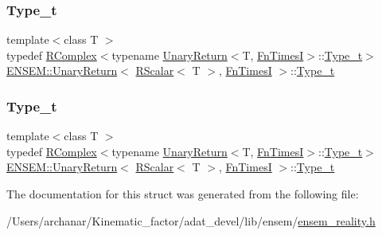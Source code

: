 \subsubsection{\texorpdfstring{Type\_t}{Type\_t}\hspace{0.1cm}{\footnotesize\ttfamily [1/2]}}
{\footnotesize\ttfamily template$<$class T $>$ \\
typedef \mbox{\hyperlink{classENSEM_1_1RComplex}{R\+Complex}}$<$typename \mbox{\hyperlink{structENSEM_1_1UnaryReturn}{Unary\+Return}}$<$T, \mbox{\hyperlink{structENSEM_1_1FnTimesI}{Fn\+TimesI}}$>$\+::\mbox{\hyperlink{structENSEM_1_1UnaryReturn_3_01RScalar_3_01T_01_4_00_01FnTimesI_01_4_ab4ba902ca0b5815b1d94723d80d0b878}{Type\+\_\+t}}$>$ \mbox{\hyperlink{structENSEM_1_1UnaryReturn}{E\+N\+S\+E\+M\+::\+Unary\+Return}}$<$ \mbox{\hyperlink{classENSEM_1_1RScalar}{R\+Scalar}}$<$ T $>$, \mbox{\hyperlink{structENSEM_1_1FnTimesI}{Fn\+TimesI}} $>$\+::\mbox{\hyperlink{structENSEM_1_1UnaryReturn_3_01RScalar_3_01T_01_4_00_01FnTimesI_01_4_ab4ba902ca0b5815b1d94723d80d0b878}{Type\+\_\+t}}}

\mbox{\label{structENSEM_1_1UnaryReturn_3_01RScalar_3_01T_01_4_00_01FnTimesI_01_4_ab4ba902ca0b5815b1d94723d80d0b878}} 
\subsubsection{\texorpdfstring{Type\_t}{Type\_t}\hspace{0.1cm}{\footnotesize\ttfamily [2/2]}}
{\footnotesize\ttfamily template$<$class T $>$ \\
typedef \mbox{\hyperlink{classENSEM_1_1RComplex}{R\+Complex}}$<$typename \mbox{\hyperlink{structENSEM_1_1UnaryReturn}{Unary\+Return}}$<$T, \mbox{\hyperlink{structENSEM_1_1FnTimesI}{Fn\+TimesI}}$>$\+::\mbox{\hyperlink{structENSEM_1_1UnaryReturn_3_01RScalar_3_01T_01_4_00_01FnTimesI_01_4_ab4ba902ca0b5815b1d94723d80d0b878}{Type\+\_\+t}}$>$ \mbox{\hyperlink{structENSEM_1_1UnaryReturn}{E\+N\+S\+E\+M\+::\+Unary\+Return}}$<$ \mbox{\hyperlink{classENSEM_1_1RScalar}{R\+Scalar}}$<$ T $>$, \mbox{\hyperlink{structENSEM_1_1FnTimesI}{Fn\+TimesI}} $>$\+::\mbox{\hyperlink{structENSEM_1_1UnaryReturn_3_01RScalar_3_01T_01_4_00_01FnTimesI_01_4_ab4ba902ca0b5815b1d94723d80d0b878}{Type\+\_\+t}}}



The documentation for this struct was generated from the following file\+:\begin{DoxyCompactItemize}
\item 
/\+Users/archanar/\+Kinematic\+\_\+factor/adat\+\_\+devel/lib/ensem/\mbox{\hyperlink{lib_2ensem_2ensem__reality_8h}{ensem\+\_\+reality.\+h}}\end{DoxyCompactItemize}
